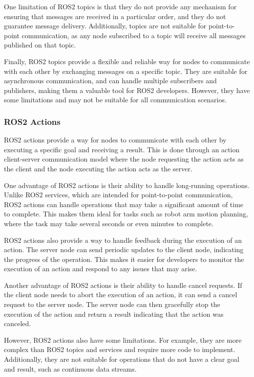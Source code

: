 \documentclass[12pt,oneside]{article}
\begin{document}
One limitation of ROS2 topics is that they do not provide any mechanism for ensuring that messages are received in a particular order, and they do not guarantee message delivery. Additionally, topics are not suitable for point-to-point communication, as any node subscribed to a topic will receive all messages published on that topic.

Finally, ROS2 topics provide a flexible and reliable way for nodes to communicate with each other by exchanging messages on a specific topic. They are suitable for asynchronous communication, and can handle multiple subscribers and publishers, making them a valuable tool for ROS2 developers. However, they have some limitations and may not be suitable for all communication scenarios.

\subsubsection{ROS2 Actions}\label{ros2-actions}
ROS2 actions provide a way for nodes to communicate with each other by executing a specific goal and receiving a result. This is done through an action client-server communication model where the node requesting the action acts as the client and the node executing the action acts as the server.

One advantage of ROS2 actions is their ability to handle long-running operations. Unlike ROS2 services, which are intended for point-to-point communication, ROS2 actions can handle operations that may take a significant amount of time to complete. This makes them ideal for tasks such as robot arm motion planning, where the task may take several seconds or even minutes to complete.

ROS2 actions also provide a way to handle feedback during the execution of an action. The server node can send periodic updates to the client node, indicating the progress of the operation. This makes it easier for developers to monitor the execution of an action and respond to any issues that may arise.

Another advantage of ROS2 actions is their ability to handle cancel requests. If the client node needs to abort the execution of an action, it can send a cancel request to the server node. The server node can then gracefully stop the execution of the action and return a result indicating that the action was canceled.

However, ROS2 actions also have some limitations. For example, they are more complex than ROS2 topics and services and require more code to implement. Additionally, they are not suitable for operations that do not have a clear goal and result, such as continuous data streams.
\end{document}
